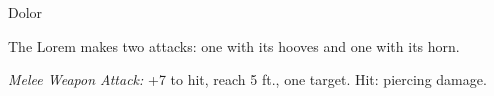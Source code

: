 \documentclass[10pt,twoside,twocolumn,openany,nodeprecatedcode]{dndbook}
\begin{document}
\begin{DndMonster}[width=\linewidth + 8pt]{Dolor}
\begin{multicols}{2}
 

The Lorem makes two attacks: one with its hooves and one with its horn.

\textsl{Melee Weapon Attack:} +7 to hit, reach 5 ft., one target. Hit:  piercing damage.

\end{multicols}

\end{DndMonster}
\end{document}
